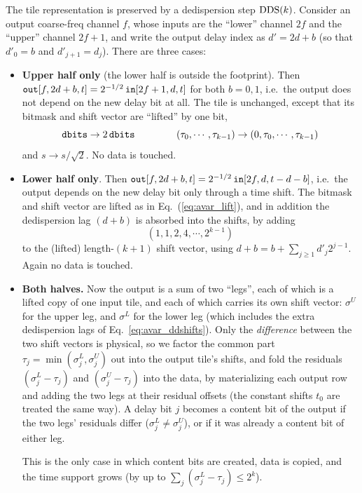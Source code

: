 \documentclass{article}
\numberwithin{equation}{section}   %
\def\DDS{{\rm DDS}}
\begin{document}
The tile representation is preserved by a dedispersion step $\DDS(k)$. Consider an output
coarse-freq channel $f$, whose inputs are the ``lower'' channel $2f$ and the ``upper'' channel
$2f+1$, and write the output delay index as $d' = 2d+b$ (so that $d'_0 = b$ and $d'_{j+1} = d_j$).
There are three cases:
\begin{itemize}

\item {\bf Upper half only} (the lower half is outside the footprint).
Then ${\tt out}[f,2d+b,t] = 2^{-1/2} \, {\tt in}[2f+1,d,t]$ for both $b=0,1$, i.e.\ the output does
not depend on the new delay bit at all. The tile is unchanged, except that its bitmask and shift
vector are ``lifted'' by one bit,
\begin{equation}
{\tt dbits} \rightarrow 2 \, {\tt dbits}
  \hspace{1.5cm}
(\tau_0, \cdots, \tau_{k-1}) \rightarrow (0, \tau_0, \cdots, \tau_{k-1})
  \label{eq:avar_lift}
\end{equation}
and $s \rightarrow s/\sqrt{2}$. No data is touched.

\item {\bf Lower half only}. Then ${\tt out}[f,2d+b,t] = 2^{-1/2} \, {\tt in}[2f,d,t-d-b]$, i.e.\ the
output depends on the new delay bit only through a time shift. The bitmask and shift vector are
lifted as in Eq.\ (\ref{eq:avar_lift}), and in addition the dedispersion lag $(d+b)$ is absorbed
into the shifts, by adding
\begin{equation}
(1, 1, 2, 4, \cdots, 2^{k-1})
  \label{eq:avar_ddshifts}
\end{equation}
to the (lifted) length-$(k+1)$ shift vector, using $d + b = b + \sum_{j \ge 1} d'_j 2^{j-1}$.
Again no data is touched.

\item {\bf Both halves.} Now the output is a sum of two ``legs'', each of which is a lifted copy of
one input tile, and each of which carries its own shift vector: $\sigma^U$ for the upper leg, and
$\sigma^L$ for the lower leg (which includes the extra dedispersion lags of
Eq.\ \ref{eq:avar_ddshifts}). Only the {\em difference} between the two shift vectors is physical,
so we factor the common part $\tau_j = \min(\sigma^L_j, \sigma^U_j)$ out into the output tile's
shifts, and fold the residuals $(\sigma^L_j - \tau_j)$ and $(\sigma^U_j - \tau_j)$ into the data,
by materializing each output row and adding the two legs at their residual offsets (the constant
shifts $t_0$ are treated the same way). A delay bit $j$ becomes a content bit of the output if the
two legs' residuals differ ($\sigma^L_j \ne \sigma^U_j$), or if it was already a content bit of
either leg.

This is the only case in which content bits are created, data is copied, and the time support
grows (by up to $\sum_j (\sigma^L_j - \tau_j) \le 2^k$).

\end{itemize}
\end{document}
